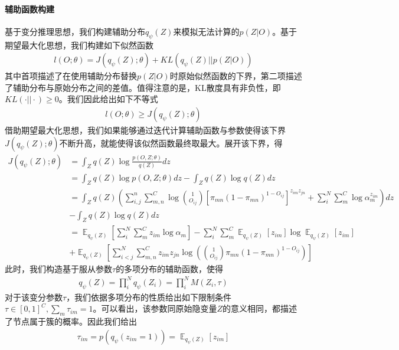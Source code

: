 \paragraph{辅助函数构建}

基于变分推理思想，我们构建辅助分布$q_\psi(Z)$来模拟无法计算的$p(Z|O)$。基于期望最大化思想，我们构建如下似然函数
\begin{equation}\begin{aligned}
l(O;\theta)=J(q_\psi(Z);\theta)+KL(q_\psi(Z)||p(Z|O))
\end{aligned}\end{equation}
其中首项描述了在使用辅助分布替换$p(Z|O)$时原始似然函数的下界，第二项描述了辅助分布与原始分布之间的差值。值得注意的是，KL散度具有非负性，即$KL(\cdot||\cdot)\geq 0$。我们因此给出如下不等式
\begin{equation}\begin{aligned}
l(O;\theta)\geq J(q_\psi(Z);\theta)
\end{aligned}\end{equation}
借助期望最大化思想，我们如果能够通过迭代计算辅助函数与参数使得该下界$J(q_\psi(Z);\theta)$不断升高，就能使得该似然函数最终取最大。展开该下界，得
\begin{equation}\begin{aligned}
J(q_\psi(Z);\theta)&={} \int_Z q(Z) \log \frac{p(O,Z;\theta)}{q(Z)}dz\\
&={} \int_Z q(Z) \log p(O,Z;\theta)dz-\int_Z q(Z) \log q(Z)dz\\
&={} \int_Z q(Z) ( \sum_{i,j}^{n}\sum_{m,n}^C\log \binom{1}{O_{ij}}[\pi_{mn}(1-\pi_{mn})^{1-O_{ij}}]^{ z_{im}z_{jn}}+
\sum_{i}^N\sum_m^C\log\alpha_m^{z_{im}})dz\\
&-\int_Z q(Z) \log q(Z)dz\\
&={}\mathop{\mathbb{E}}_{q_\psi(Z)}[\sum_i^N\sum_m^Cz_{im}\log \alpha_m]-\sum_i^N\sum_m^C \mathop{\mathbb{E}}_{q_\psi(Z)}[z_{im}]\log \mathop{\mathbb{E}}_{q_\psi(Z)}[z_{im}]\\
&+\mathop{\mathbb{E}}_{q_\psi(Z)}[\sum_{i<j}^N\sum_{m,n}^Cz_{im}z_{jn}\log ( \binom{1}{O_{ij}}
\pi_{mn}(1-\pi_{mn})^{1-O_{ij}})]
\end{aligned}\end{equation}
此时，我们构造基于服从参数$\tau$的多项分布的辅助函数，使得
\begin{equation}\begin{aligned}
q_\psi(Z)=\prod_i^N q_\psi(Z_i)=\prod_i^N M(Z_i,\tau)
\end{aligned}\end{equation}
对于该变分参数$\tau$，我们依据多项分布的性质给出如下限制条件$\tau \in [0,1]^C,\sum_m \tau_{im} =1$。可以看出，该参数同原始隐变量$Z$的意义相同，都描述了节点属于簇的概率。因此我们给出
\begin{equation}\begin{aligned}
\tau_{im}=p(q_\psi(z_{im}=1))=\mathop{\mathbb{E}}_{q_\psi(Z)}[z_{im}]
\end{aligned}\end{equation}

